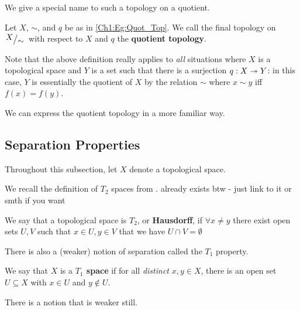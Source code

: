 We give a special name to such a topology on a quotient.

\begin{boxdefinition}
    Let $X$, $\sim$, and $q$ be as in \eqref{Ch1:Eg:Quot_Top}. We call the final topology on $\quotient{X}{\sim}$ with respect to $X$ and $q$ the \textbf{quotient topology}.
\end{boxdefinition}

Note that the above definition really applies to \textit{all} situations where $X$ is a topological space and $Y$ is a set such that there is a surjection $q : X \twoheadrightarrow Y$: in this case, $Y$ is essentially the quotient of $X$ by the relation $\sim$ where $x \sim y$ iff $f(x) = f(y)$.

We can express the quotient topology in a more familiar way.

\begin{boxproposition}
    \sorry %
\end{boxproposition}

\subsection{Separation Properties}

Throughout this subsection, let $X$ denote a topological space.

We recall the definition of $T_2$ spaces from .
 already exists btw - just link to it or smth if you want
\begin{boxdefinition}
    We say that a topological space is \textbf{$T_2$}, or \textbf{Hausdorff}, if $\forall x\neq y$ there exist open sets $U, V$ such that $x\in U, y \in V$ that we have $U\cap V=\emptyset$
\end{boxdefinition}

There is also a (weaker) notion of separation called the $T_1$ property.

\begin{boxdefinition}[$T_1$ property]
    We say that $X$ is a \textbf{$T_1$ space} if for all \textit{distinct} $x, y \in X$, there is an open set $U \subseteq X$ with $x \in U$ and $y \notin U$.
\end{boxdefinition} 

There is a notion that is weaker still.

